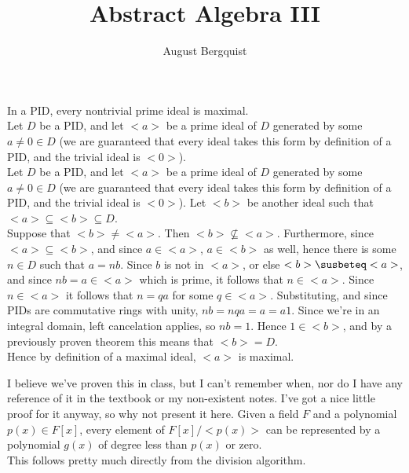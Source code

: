 \documentclass{article}
\title{Abstract Algebra III}
\author{August Bergquist}
\begin{document}
\maketitle


 In a PID, every nontrivial prime ideal is maximal. \\

 Let $D$ be a PID, and let $<a>$ be a prime ideal of $D$ generated by some $a\ne 0\in D$ (we are guaranteed that every ideal takes this form by definition of a PID, and the trivial ideal is $<0>$).\\



 Let $D$ be a PID, and let $<a>$ be a prime ideal of $D$ generated by some $a\ne 0\in D$ (we are guaranteed that every ideal takes this form by definition of a PID, and the trivial ideal is $<0>$). Let $<b>$ be another ideal such that $<a>\subseteq <b> \subseteq D$.\\

Suppose that $<b>\ne <a>$. Then $<b>\not \subseteq <a>$. Furthermore, since $ <a>\subseteq <b> $, and since $a\in <a>$, $a\in <b>$ as well, hence there is some $n\in D$ such that $a = nb$. Since $b$ is not in $<a>$, or else $<b>\susbeteq <a>$, and since $nb= a\in <a>$ which is prime, it follows that $n\in <a>$. Since $n\in <a>$ it follows that $n = qa$ for some $q\in <a>$. Substituting, and since PIDs are commutative rings with unity, $nb = nqa = a = a1$. Since we're in an integral domain, left cancelation applies, so $nb = 1$. Hence $1\in <b>$, and by a previously proven theorem this means that $<b> = D$.\\

Hence by definition of a maximal ideal, $<a>$ is maximal.

 I believe we've proven this in class, but I can't remember when, nor do I have any reference of it in the textbook or my non-existent notes. I've got a nice little proof for it anyway, so why not present it here. Given a field $F$ and a polynomial $p(x) \in F[x]$, every element of $F[x]/<p(x)>$ can be represented by a polynomial $g(x)$ of degree less than $p(x)$ or zero.\\

 This follows pretty much directly from the division algorithm.\\
\end{document}
